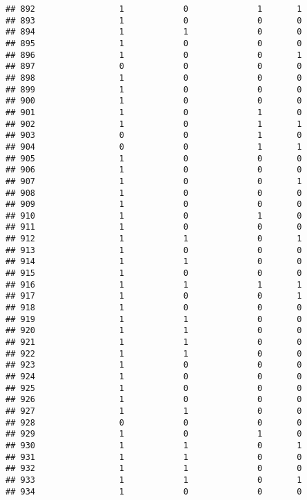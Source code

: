 \documentclass[]{article}
\begin{document}
\begin{verbatim}
## 892                 1            0              1       1
## 893                 1            0              0       0
## 894                 1            1              0       0
## 895                 1            0              0       0
## 896                 1            0              0       1
## 897                 0            0              0       0
## 898                 1            0              0       0
## 899                 1            0              0       0
## 900                 1            0              0       0
## 901                 1            0              1       0
## 902                 1            0              1       1
## 903                 0            0              1       0
## 904                 0            0              1       1
## 905                 1            0              0       0
## 906                 1            0              0       0
## 907                 1            0              0       1
## 908                 1            0              0       0
## 909                 1            0              0       0
## 910                 1            0              1       0
## 911                 1            0              0       0
## 912                 1            1              0       1
## 913                 1            0              0       0
## 914                 1            1              0       0
## 915                 1            0              0       0
## 916                 1            1              1       1
## 917                 1            0              0       1
## 918                 1            0              0       0
## 919                 1            1              0       0
## 920                 1            1              0       0
## 921                 1            1              0       0
## 922                 1            1              0       0
## 923                 1            0              0       0
## 924                 1            0              0       0
## 925                 1            0              0       0
## 926                 1            0              0       0
## 927                 1            1              0       0
## 928                 0            0              0       0
## 929                 1            0              1       0
## 930                 1            1              0       1
## 931                 1            1              0       0
## 932                 1            1              0       0
## 933                 1            1              0       1
## 934                 1            0              0       0

\end{verbatim}
\end{document}
